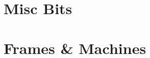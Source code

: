\documentclass[9pt,xcolor={svgnames, x11names}]{beamer}
\begin{document}


%   


\section{Misc Bits}


%   


%   


\section{Frames \& Machines}

\end{document}

